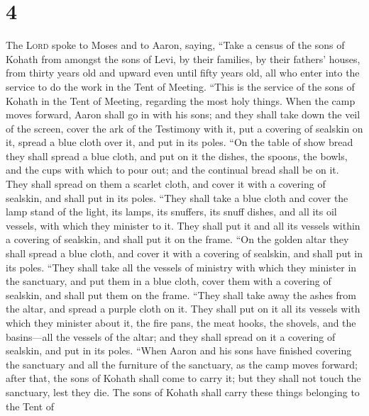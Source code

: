 \hypertarget{section-3}{%
\section{4}\label{section-3}}

 The \textsc{Lord} spoke to Moses and to Aaron, saying,
 ``Take a census of the sons of Kohath from amongst the
sons of Levi, by their families, by their fathers' houses,
 from thirty years old and upward even until fifty years
old, all who enter into the service to do the work in the Tent of
Meeting.  ``This is the service of the sons of Kohath in
the Tent of Meeting, regarding the most holy things.  When
the camp moves forward, Aaron shall go in with his sons; and they shall
take down the veil of the screen, cover the ark of the Testimony with
it,  put a covering of sealskin on it, spread a blue cloth
over it, and put in its poles.  ``On the table of show
bread they shall spread a blue cloth, and put on it the dishes, the
spoons, the bowls, and the cups with which to pour out; and the
continual bread shall be on it.  They shall spread on them
a scarlet cloth, and cover it with a covering of sealskin, and shall put
in its poles.  ``They shall take a blue cloth and cover
the lamp stand of the light, its lamps, its snuffers, its snuff dishes,
and all its oil vessels, with which they minister to it. 
They shall put it and all its vessels within a covering of sealskin, and
shall put it on the frame.  ``On the golden altar they
shall spread a blue cloth, and cover it with a covering of sealskin, and
shall put in its poles.  ``They shall take all the
vessels of ministry with which they minister in the sanctuary, and put
them in a blue cloth, cover them with a covering of sealskin, and shall
put them on the frame.  ``They shall take away the ashes
from the altar, and spread a purple cloth on it.  They
shall put on it all its vessels with which they minister about it, the
fire pans, the meat hooks, the shovels, and the basins---all the vessels
of the altar; and they shall spread on it a covering of sealskin, and
put in its poles.  ``When Aaron and his sons have
finished covering the sanctuary and all the furniture of the sanctuary,
as the camp moves forward; after that, the sons of Kohath shall come to
carry it; but they shall not touch the sanctuary, lest they die. The
sons of Kohath shall carry these things belonging to the Tent of
